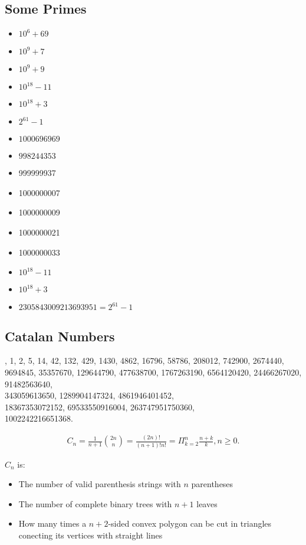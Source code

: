 \documentclass[a4paper]{article}
\begin{document}
\subsection{Some Primes}
\begin{multicols}{2}
\begin{itemize}
  \itemsep -2pt
  \item $10^6 + 69$
  \item $10^9 + 7$
  \item $10^9 + 9$
  \item $10^{18}-11$
  \item $10^{18}+3$
  \item $2^{61}-1$
  \item $1000696969$
  \item $998244353$
  \item 999999937
  \item 1000000007
  \item 1000000009
  \item 1000000021
  \item 1000000033
  \item $10^{18} - 11$
  \item $10^{18} + 3$
  \item $2305843009213693951 = 2^{61} - 1$
\end{itemize}
\end{multicols}

\subsection{Catalan Numbers}
{, 1, 2, 5, 14, 42, 132, 429, 1430, 4862, 16796, 58786, 208012, 742900, 2674440,
9694845, 35357670, 129644790, 477638700, 1767263190, 6564120420,
24466267020, 91482563640, \\343059613650, 1289904147324, 4861946401452,
\\18367353072152, 69533550916004, 263747951750360, \\1002242216651368.}

\begin{align*}
  C_n = \frac{1}{n+1} \binom{2n}{n} = \frac{(2n)!}{(n+1)!n!} = \Pi^n_{k=2} \frac{n+k}{k}, n \ge 0.
\end{align*}

$C_n$ is:
\begin{itemize}
  \itemsep -2pt
  \item The number of valid parenthesis strings with $n$ parentheses
  \item The number of complete binary trees with $n+1$ leaves
  \item How many times a $n+2$-sided convex polygon can be cut in triangles conecting its vertices with straight lines
\end{itemize}
\end{document}
